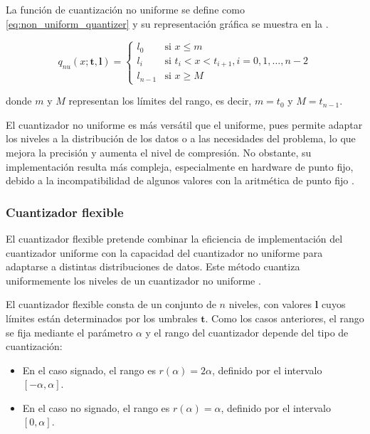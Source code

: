 La función de cuantización no uniforme se define como \eqref{eq:non_uniform_quantizer} y su representación gráfica se muestra en la .

\begin{equation}
    \label{eq:non_uniform_quantizer}
    q_{nu}\left(x; \mathbf{t}, \mathbf{l}\right) =
    \begin{cases}
        l_{0} & \text{si $x \leq m$} \\
        l_{i} & \text{si } t_i < x < t_{i+1}, i = 0, 1, \ldots, n-2 \\
        l_{n-1} & \text{si } x \geq M
    \end{cases}
\end{equation}

donde $m$ y $M$ representan los límites del rango, es decir, $m = t_0$ y $M = t_{n-1}$.


El cuantizador no uniforme es más versátil que el uniforme, pues permite adaptar los niveles a la distribución de los datos o a las necesidades del problema, lo que mejora la precisión y aumenta el nivel de compresión. No obstante, su implementación resulta más compleja, especialmente en hardware de punto fijo, debido a la incompatibilidad de algunos valores con la aritmética de punto fijo \cite{electronics13101923}.


\subsubsection{Cuantizador flexible}
\label{sec:flex}

El cuantizador flexible pretende combinar la eficiencia de implementación del cuantizador uniforme con la capacidad del cuantizador no uniforme para adaptarse a distintas distribuciones de datos. Este método cuantiza uniformemente los niveles de un cuantizador no uniforme \cite{electronics13101923}.

El cuantizador flexible consta de un conjunto de $n$ niveles, con valores $\mathbf{l}$ cuyos límites están determinados por los umbrales $\mathbf{t}$. Como los casos anteriores, el rango se fija mediante el parámetro $\alpha$ y el rango del cuantizador depende del tipo de cuantización:

\begin{itemize}
    \item En el caso signado, el rango es $r(\alpha) = 2\alpha$, definido por el intervalo $[-\alpha, \alpha].$
    \item En el caso no signado, el rango es $r(\alpha) = \alpha$, definido por el intervalo $[0, \alpha].$
\end{itemize}


